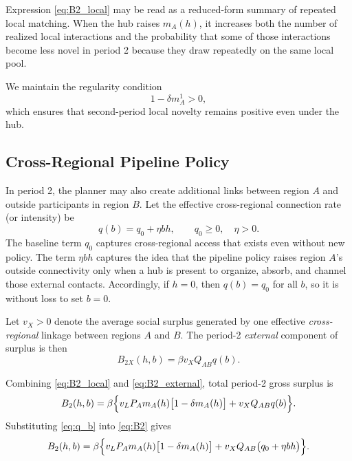 Expression \eqref{eq:B2_local} may be read as a reduced-form summary of repeated local matching. When the hub raises $m_A(h)$, it increases both the number of realized local interactions and the probability that some of those interactions become less novel in period 2 because they draw repeatedly on the same local pool.

We maintain the regularity condition
\begin{equation}
1-\delta m_A^1 > 0,
\label{eq:regularity}
\end{equation}
which ensures that second-period local novelty remains positive even under the hub.

\subsection{Cross-Regional Pipeline Policy}

In period 2, the planner may also create additional links between region $A$ and outside participants in region $B$. Let the effective cross-regional connection rate (or intensity) be
\begin{equation}
q(b)=q_0+\eta b h,
\qquad
q_0\ge 0,
\quad
\eta>0.
\label{eq:q_b}
\end{equation}
The baseline term $q_0$ captures cross-regional access that exists even without new policy. The term $\eta b h$ captures the idea that the pipeline policy raises region $A$'s outside connectivity only when a hub is present to organize, absorb, and channel those external contacts. Accordingly, if $h=0$, then $q(b)=q_0$ for all $b$, so it is without loss to set $b=0$.

Let $v_X>0$ denote the average social surplus generated by one effective \emph{cross-regional} linkage between regions $A$ and $B$. The period-2 \emph{external} component of surplus is then
\begin{equation}
B_{2X}(h,b)
=
\beta v_X Q_{AB} q(b).
\label{eq:B2_external}
\end{equation}

Combining \eqref{eq:B2_local} and \eqref{eq:B2_external}, total period-2 gross surplus is
\begin{equation}
B_2(h,b)
=
\beta\Bigl\{v_L P_A m_A(h)\bigl[1-\delta m_A(h)\bigr] + v_X Q_{AB} q(b)\Bigr\}.
\label{eq:B2}
\end{equation}
Substituting \eqref{eq:q_b} into \eqref{eq:B2} gives
\begin{equation}
B_2(h,b)
=
\beta\Bigl\{v_L P_A m_A(h)\bigl[1-\delta m_A(h)\bigr] + v_X Q_{AB}\bigl(q_0+\eta b h\bigr)\Bigr\}.
\label{eq:B2_expanded}
\end{equation}

